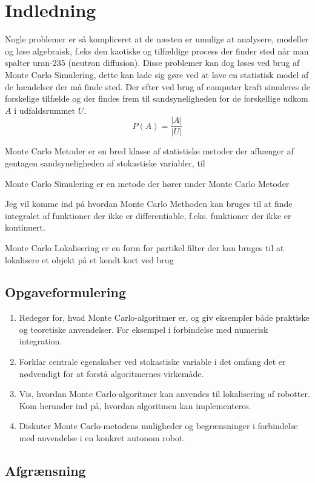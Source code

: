 \documentclass[../../SRP.tex]{subfiles}
\begin{document}
\chapter{Indledning}
Nogle problemer er så kompliceret at de næsten er umulige at analysere, modeller og løse algebraisk, f.eks den kaotiske og tilfældige process der finder sted når man spalter uran-235 (neutron diffusion). Disse problemer kan dog løses ved brug af Monte Carlo Simulering, dette kan lade sig gøre ved at lave en statistisk model af de hændelser der må finde sted. Der efter ved brug af computer kraft simuleres de forskelige tilfælde og der findes frem til sandsyneligheden for de forskellige udkom $A$ i udfaldsrummet $U$.
\[
  P(A) = \frac{|A|}{|U|}
\]

Monte Carlo Metoder er en bred klasse af statistiske metoder der afhænger af gentagen sandsyneligheden af stokastiske variabler, til

Monte Carlo Simulering er en metode der hører under Monte Carlo Metoder

Jeg vil komme ind på hvordan Monte Carlo Methoden kan bruges til at finde integralet af funktioner der ikke er differentiable, f.eks. funktioner der ikke er kontinuert.

Monte Carlo Lokalisering er en form for partikel filter der kan bruges til at lokalisere et objekt på et kendt kort ved brug 


\section{Opgaveformulering}
  \begin{enumerate}[label=(\Roman*)]
  \item Redegør for, hvad Monte Carlo-algoritmer er, og giv eksempler både praktiske og teoretiske anvendelser. For eksempel i forbindelse med numerisk integration.

  \item Forklar centrale egenskaber ved stokastiske variable i det omfang det er nødvendigt for at forstå algoritmernes virkemåde.

  \item Vis, hvordan Monte Carlo-algoritmer kan anvendes til lokalisering af robotter. Kom herunder ind på, hvordan algoritmen kan implementeres.

  \item Diskuter Monte Carlo-metodens muligheder og begrænsninger i forbindelse med anvendelse i en konkret autonom robot.
  \end{enumerate}

\section{Afgrænsning}
\end{document}
